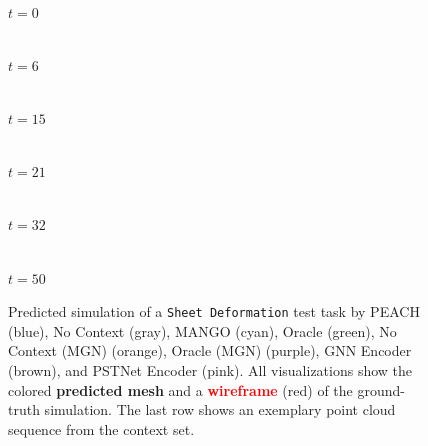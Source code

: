 \begin{figure}[p]
    \begin{minipage}[c]{0.158\textwidth}\centering
        \\[2pt]
        \footnotesize$t{=}0$
    \end{minipage}%
    \begin{minipage}[c]{0.158\textwidth}\centering
        \\[2pt]
        \footnotesize$t{=}6$
    \end{minipage}%
    \begin{minipage}[c]{0.158\textwidth}\centering
        \\[2pt]
        \footnotesize$t{=}15$
    \end{minipage}%
    \begin{minipage}[c]{0.158\textwidth}\centering
        \\[2pt]
        \footnotesize$t{=}21$
    \end{minipage}%
    \begin{minipage}[c]{0.158\textwidth}\centering
        \\[2pt]
        \footnotesize$t{=}32$
    \end{minipage}%
    \begin{minipage}[c]{0.158\textwidth}\centering
        \\[2pt]
        \footnotesize$t{=}50$
    \end{minipage}

    \par\vfill
    \caption{
Predicted simulation of a \texttt{Sheet Deformation} test task by
\textcolor{TabBlue}{PEACH} (blue),
\textcolor{TabGray}{No Context} (gray),
\textcolor{TabCyan}{MANGO} (cyan),
\textcolor{TabGreen}{Oracle} (green),
\textcolor{TabOrange}{No Context (MGN)} (orange),
\textcolor{TabPurple}{Oracle (MGN)} (purple),
\textcolor{TabBrown}{GNN Encoder} (brown), and
\textcolor{TabPink}{PSTNet Encoder} (pink).
All visualizations show the colored \textbf{predicted mesh} and a \textbf{\textcolor{red}{wireframe}} (red) of the ground-truth simulation. The last row shows an exemplary point cloud sequence from the context set.
    }
    \label{fig:qualitative_trajectories_sd}
\end{figure}
